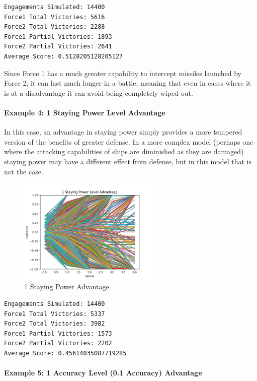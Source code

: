 \begin{verbatim}
Engagements Simulated: 14400
Force1 Total Victories: 5616
Force2 Total Victories: 2288
Force1 Partial Victories: 1893
Force2 Partial Victories: 2641
Average Score: 0.5128205128205127
\end{verbatim}

Since Force 1 has a much greater capability to intercept missiles
launched by Force 2, it can last much longer in a battle, meaning that
even in cases where it is at a disadvantage it can avoid being
completely wiped out.

\hypertarget{example-4-1-staying-power-level-advantage}{%
\paragraph{Example 4: 1 Staying Power Level
Advantage}\label{example-4-1-staying-power-level-advantage}}

In this case, an advantage in staying power simply provides a more
tempered version of the benefits of greater defense. In a more complex
model (perhaps one where the attacking capabilities of ships are
diminished as they are damaged) staying power may have a different
effect from defense, but in this model that is not the case.

\begin{figure}
\hypertarget{fig:refname}{%
\centering
\includegraphics[width=0.6\textwidth,height=\textheight]{figures/1StayingAdv.png}
\caption{1 Staying Power Advantage}\label{fig:refname}
}
\end{figure}

\begin{verbatim}
Engagements Simulated: 14400
Force1 Total Victories: 5337
Force2 Total Victories: 3982
Force1 Partial Victories: 1573
Force2 Partial Victories: 2202
Average Score: 0.45614035087719285
\end{verbatim}

\hypertarget{example-5-1-accuracy-level-0.1-accuracy-advantage}{%
\paragraph{Example 5: 1 Accuracy Level (0.1 Accuracy)
Advantage}\label{example-5-1-accuracy-level-0.1-accuracy-advantage}}

